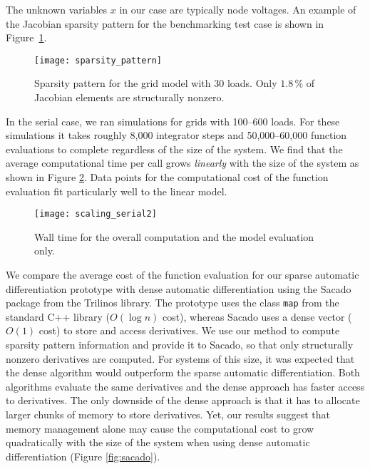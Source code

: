 \documentclass[10pt]{ijnam}
\theoremstyle{definition}
\begin{document}
The unknown variables $ x $ in our case are typically node voltages. An example of the Jacobian sparsity pattern for the benchmarking test case is shown in Figure~\ref{fig:sparsity_pattern}.

\begin{figure}[htb]
    \centering
    \texttt{[image: sparsity\_pattern]} 
    \caption{Sparsity pattern for the grid model with 30 loads. Only 
    $1.8\,\%$ of Jacobian elements are structurally nonzero. }
    \label{fig:sparsity_pattern}
\end{figure}

In the serial case, we ran simulations for grids with 100--600 loads. For these 
simulations it takes roughly 8,000 integrator steps and 50,000--60,000 function 
evaluations to complete regardless of the size of the system.
We find that the average computational time per call grows \textit{linearly} with 
the size of the system as shown in Figure \ref{fig:serial}. 
Data points for the computational cost of the function evaluation fit particularly 
well to the linear model. 



\begin{figure}[htb]
    \centering
    \texttt{[image: scaling\_serial2]} 
    \caption{Wall time for the overall computation and the model evaluation only.}
    \label{fig:serial}
\end{figure}

We compare the average cost of the function evaluation for our sparse automatic 
differentiation prototype with dense automatic differentiation using the
Sacado package from the Trilinos library. The prototype uses the class \verb|map| from the standard
C++ library ($O(\log n)$ cost), whereas Sacado uses a dense vector ($O(1)$ cost)
to store and access derivatives. We use our method to compute sparsity pattern 
information and provide it to Sacado, so that only structurally nonzero derivatives are computed. 
For systems of this size, it was expected that the dense algorithm would 
outperform the sparse automatic differentiation. Both algorithms evaluate 
the same derivatives and the dense approach has faster access to derivatives. 
The only downside of the dense approach is that it has to allocate larger 
chunks of memory to store derivatives. Yet, our results suggest that 
memory management alone may cause the computational cost to grow quadratically 
with the size of the system when using dense automatic differentiation 
(Figure \ref{fig:sacado}). 
\end{document}
